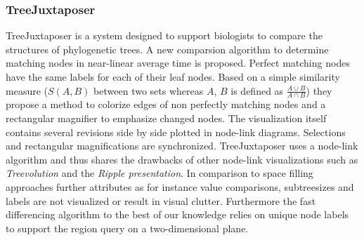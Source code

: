 



\subsubsection{TreeJuxtaposer\cite{munzner2003treejuxtaposer}}
TreeJuxtaposer is a system designed to support biologists to compare the structures of phylogenetic trees. A new comparsion algorithm to determine matching nodes in near-linear average time is proposed. Perfect matching nodes have the same labels for each of their leaf nodes. Based on a simple similarity measure ($S(A,B)$ between two sets whereas $A$, $B$ is defined as $\frac{A \cup B}{A \cap B}$) they propose a method to colorize edges of non perfectly matching nodes and a rectangular magnifier to emphasize changed nodes. The visualization itself contains several revisions side by side plotted in node-link diagrams. Selections and rectangular magnifications are synchronized. TreeJuxtaposer uses a node-link algorithm and thus shares the drawbacks of other node-link visualizations such as \emph{Treevolution} and the \emph{Ripple presentation}. In comparison to space filling approaches further attributes as for instance value comparisons, subtreesizes and labels are not visualized or result in visual clutter. Furthermore the fast differencing algorithm to the best of our knowledge relies on unique node labels to support the region query on a two-dimensional plane.


